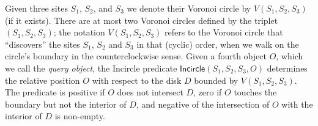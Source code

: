 \documentclass[letterpaper,11pt]{article}
\newcommand{\incircle}{\textsf{Incircle}\xspace}
\newcommand{\vor}{Voronoi\xspace}
\newcommand{\EE}{\mathbb{E}\xspace}
\begin{document}
\begin{comment}
\newcommand{\cl}[1]{\mathcal{#1}}

Let $\cl{S}$ be a set of input sites, where we use the term \emph{site}
to refer to a closed line segment $t$ or a point $p$. Given $t$, we
call \emph{open segment}, and denote it by $t^\circ$, the subset of
$t$ we get by removing from $t$ its two endpoints. 

The Euclidean distance of a point $X\in\EE^2$ from a site $S_i$ is
defined as $d(X,S_i) = \inf\{\|X-Y\|: Y\in S_i\}$.
Let $H_{ij} = \{X\in\EE^2: d(X,S_i)\le{}d(X,S_j)\}$.
The locus of points $\pi_{ij}$ at equal distance from $S_i$ and $S_j$,
also called the \emph{bisector} of $S_i$ and $S_j$, is then the set
$H_{ij}\cap{}H_{ji}$. Assuming that the set $\cl{S}$ consists of disjoint
sites only, the bisectors are curves homeomorphic to the line.
They consist of at most seven distinct parts, three of which are
parabolic arcs, while the remaining four are linear segments or rays.
The \emph{Voronoi cell} $V(S_i)$ is defined to be the set of points in
$X\in\EE^2$ that are closer (or at equal distance) to $S_i$ than to
any other site $S_j$ in $\cl{S}$, i.e.,
$V(S_i)=\cap_{i\ne{}j}H_{ij}$. The connected sets of points that
belong to the intersection of exactly two Voronoi cells are called
\emph{Voronoi edges}, whereas the the points that belong to at least
three Voronoi cells are called \emph{Voronoi vertices}. The circle
centered at a \vor vertex that touches the sites of the adjacent to
the vertex \vor cells, is called the \emph{Voronoi circle}.
The subdivision of the plane into Voronoi vertices, edges and cells is
called the {\em Voronoi diagram} $\cl{V}(\cl{S})$ of $\cl{S}$.
In the rest of the paper, we assume that $\cl{S}$ contains sites that
are either points or open segments that pairwise disjoint, i.e.,
segments may have common endpoints, but not common interior
points. This is a standard assumption when studying the \vor diagram
of line segments, since otherwise it is possible to have
two-dimensional bisectors.
\end{comment}

Given three sites $S_1$, $S_2$, and $S_3$ we denote their \vor circle
by $V(S_1,S_2,S_3)$ (if it exists). There are at most two \vor circles
defined by the triplet $(S_1,S_2,S_3)$; the notation $V(S_1,S_2,S_3)$
refers to the \vor circle that ``discovers'' the sites $S_1$, $S_2$
and $S_3$ in that (cyclic) order, when we walk on the circle's
boundary in the counterclockwise sense. Given a fourth object $O$, which
we call the \emph{query object}, the \incircle predicate
$\incircle(S_1,S_2,S_3,O)$ determines the relative position $O$ with
respect to the disk $D$ bounded by $V(S_1,S_2,S_3)$. The predicate is
positive if $O$ does not intersect $D$, zero if $O$ touches the
boundary but not the interior of $D$, and negative of the
intersection of $O$ with the interior of $D$ is non-empty. 
\end{document}

